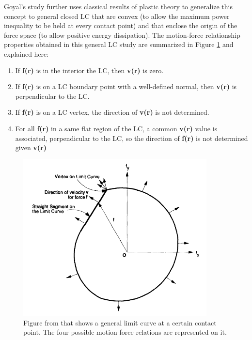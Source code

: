 \documentclass[12,twoside]{TFG-GM}
\theoremstyle{definition}
\theoremstyle{remark}
\begin{document}
Goyal's study further uses classical results of plastic theory to generalize this concept to general closed LC that are convex (to allow the maximum power inequality to be held at every contact point) and that enclose the origin of the force space (to allow positive energy dissipation). The motion-force relationship properties obtained in this general LC study are summarized in Figure \ref{fig:general_lc} and explained here:

\begin{enumerate}
\item If \textbf{f(r)} is in the interior the LC, then \textbf{v(r)} is zero.
\item If \textbf{f(r)} is on a LC boundary point with a well-defined normal, then \textbf{v(r)} is perpendicular to the LC.
\item If \textbf{f(r)} is on a LC vertex, the direction of \textbf{v(r)} is not determined.
\item For all \textbf{f(r)} in a same flat region of the LC, a common \textbf{v(r)} value is associated, perpendicular to the LC, so the direction of \textbf{f(r)} is not determined given \textbf{v(r)}
\end{enumerate}

\begin{figure}[htb!]
\begin{center}
\includegraphics[width=10cm]{general_lc.png}
\end{center}
\caption[test caption]{\label{fig:general_lc} \small{Figure from \protect\cite{planar_sliding1} that shows a general limit curve at a certain contact point. The four possible motion-force relations are represented on it.}}
\end{figure}
\end{document}
